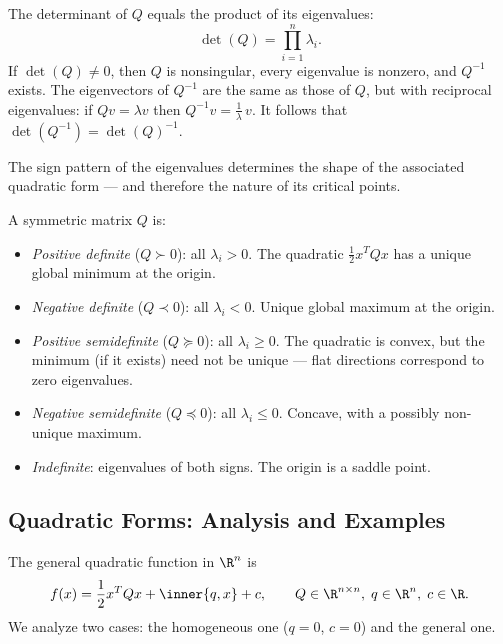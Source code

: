 \begin{defn}[Determinant]\label{def:determinant}
  The determinant of $Q$ equals the product of its eigenvalues:
  $$
    \det(Q) = \prod_{i=1}^{n} \lambda_i.
  $$
  If $\det(Q) \neq 0$, then $Q$ is nonsingular, every eigenvalue is nonzero, and $Q^{-1}$ exists.
  The eigenvectors of $Q^{-1}$ are the same as those of $Q$, but with reciprocal eigenvalues: if $Qv = \lambda v$ then $Q^{-1} v = \frac{1}{\lambda}\, v$.
  It follows that $\det(Q^{-1}) = \det(Q)^{-1}$.
\end{defn}

The sign pattern of the eigenvalues determines the shape of the associated quadratic form — and therefore the nature of its critical points.

\begin{defn}\label{def:definiteness}
  A symmetric matrix $Q$ is:
  \begin{itemize}
    \item \textit{Positive definite} ($Q \succ 0$): all $\lambda_i > 0$.
      The quadratic $\frac{1}{2} x^T Q x$ has a unique global minimum at the origin.
    \item \textit{Negative definite} ($Q \prec 0$): all $\lambda_i < 0$.
      Unique global maximum at the origin.
    \item \textit{Positive semidefinite} ($Q \succeq 0$): all $\lambda_i \geq 0$.
      The quadratic is convex, but the minimum (if it exists) need not be unique — flat directions correspond to zero eigenvalues.
    \item \textit{Negative semidefinite} ($Q \preceq 0$): all $\lambda_i \leq 0$.
      Concave, with a possibly non-unique maximum.
    \item \textit{Indefinite}: eigenvalues of both signs.
      The origin is a saddle point.
  \end{itemize}
\end{defn}


\subsection{Quadratic Forms: Analysis and Examples}

The general quadratic function in $\R^n$ is
$$
  f(x) = \frac{1}{2} x^T Q x + \inner{q, x} + c,
  \qquad Q \in \R^{n \times n},\; q \in \R^n,\; c \in \R.
$$
We analyze two cases: the homogeneous one ($q = 0$, $c = 0$) and the general one.


